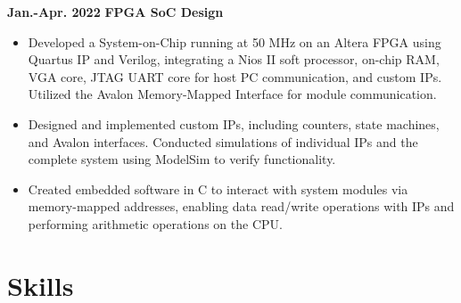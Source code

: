 \documentclass[11pt,a4paper,sans]{moderncv}
\begin{document}
%



\cventry
{\textnormal{\textbf{Jan.-Apr. 2022}}}
{\textnormal{\textbf{FPGA SoC Design}}}
{}{}{}
{
    \begin{itemize}
    \item Developed a System-on-Chip running at 50 MHz on an Altera FPGA using Quartus IP and Verilog, integrating a Nios II soft processor, on-chip RAM, VGA core, JTAG UART core for host PC communication, and custom IPs. Utilized the Avalon Memory-Mapped Interface for module communication.
    \item Designed and implemented custom IPs, including counters, state machines, and Avalon interfaces. Conducted simulations of individual IPs and the complete system using ModelSim to verify functionality.
    \item Created embedded software in C to interact with system modules via memory-mapped addresses, enabling data read/write operations with IPs and performing arithmetic operations on the CPU.
    \end{itemize}
}

\vspace{-0.2cm} 

\section{Skills}
\end{document}
